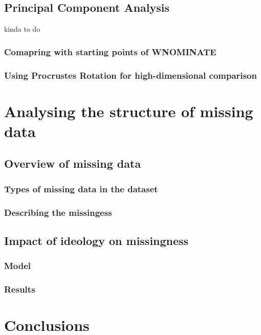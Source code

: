 \documentclass{report}
\begin{document}
    \section{Principal Component Analysis}

    kinda to do

    \subsection{Comapring with starting points of WNOMINATE}

    \subsection{Using Procrustes Rotation for high-dimensional comparison}


    \chapter{Analysing the structure of missing data}


    \section{Overview of missing data}

    \subsection{Types of missing data in the dataset}

    \subsection{Describing the missingess}


    \section{Impact of ideology on missingness}

    \subsection{Model}

    \subsection{Results}


    \chapter{Conclusions}
\end{document}
